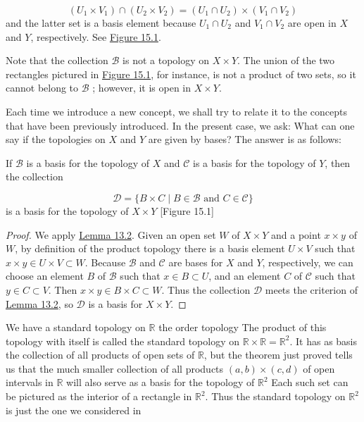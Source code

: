 \[
( {U_{1} \times {V}_{1}}) \cap ( {U_{2} \times {V}_{2}}) = ( {U_{1} \cap {U}_{2}}) \times ( {V_{1} \cap {V}_{2}})
\]
and the latter set is a basis element because \(U_{1} \cap {U}_{2}\) and \(V_{1} \cap {V}_{2}\) are open in \(X\) and \(Y\), respectively. See \hyperref[fig:15.1]{Figure 15.1}.

Note that the collection \(\mathcal{B}\) is not a topology on \(X \times Y\). The union of the two rectangles pictured in \hyperref[fig:15.1]{Figure 15.1}, for instance, is not a product of two sets, so it cannot belong to \(\mathcal{B}\) ; however, it is open in \(X \times Y\).

Each time we introduce a new concept, we shall try to relate it to the concepts that have been previously introduced. In the present case, we ask: What can one say if the topologies on \(X\) and \(Y\) are given by bases? The answer is as follows:

\begin{theorem}
\label{thm:\thetheorem}
 If \(\mathcal{B}\) is a basis for the topology of \(X\) and \(\mathcal{C}\) is a basis for the topology of \(Y\), then the collection

 \[
 \mathcal{D} = \{ B \times C \mid B \in \mathcal{B}\text{ and }C \in \mathcal{C}\}
 \]
 is a basis for the topology of \(X \times Y\)
 [Figure 15.1]
\end{theorem}

\begin{proof}
 We apply \hyperref[lem:13.2]{Lemma 13.2}. Given an open set \(W\) of \(X \times Y\) and a point \(x \times y\) of \(W\), by definition of the product topology there is a basis element \(U \times V\) such that \(x \times y \in U \times V \subset W\). Because \(\mathcal{B}\) and \(\mathcal{C}\) are bases for \(X\) and \(Y\), respectively, we can choose an element \(B\) of \(\mathcal{B}\) such that \(x \in B \subset U\), and an element \(C\) of \(\mathcal{C}\) such that \(y \in C \subset V\). Then \(x \times y \in B \times C \subset W\). Thus the collection \(\mathcal{D}\) meets the criterion of \hyperref[lem:13.2]{Lemma 13.2}, so \(\mathcal{D}\) is a basis for \(X \times Y\).
\end{proof}

\begin{centeredblock}
\begin{example}
\label{ex:\thesection.\theexample}
 We have a standard topology on \(\mathbb{R}\) the order topology The product of this topology with itself is called the standard topology on \(\mathbb{R} \times \mathbb{R} = \mathbb{R}^{2}\). It has as basis the collection of all products of open sets of \(\mathbb{R}\), but the theorem just proved tells us that the much smaller collection of all products \(( {a,b}) \times ( {c,d})\) of open intervals in \(\mathbb{R}\) will also serve as a basis for the topology of \(\mathbb{R}^{2}\) Each such set can be pictured as the interior of a rectangle in \(\mathbb{R}^{2}\). Thus the standard topology on \(\mathbb{R}^{2}\) is just the one we considered in 
\end{example}
\end{centeredblock}

